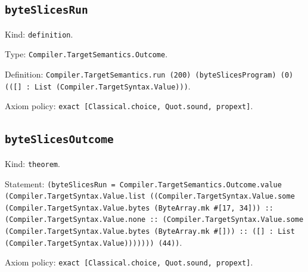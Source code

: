 \documentclass[11pt]{article}
\begin{document}
\subsection*{\texttt{byteSlicesRun}}
\noindent Kind: \texttt{definition}.\par
\noindent Type: \texttt{Compiler.TargetSemantics.Outcome}.\par
\noindent Definition: \texttt{Compiler.TargetSemantics.run (200) (byteSlicesProgram) (0) (([] : List (Compiler.TargetSyntax.Value)))}.\par
\noindent Axiom policy: \texttt{exact [Classical.choice, Quot.sound, propext]}.\par
\subsection*{\texttt{byteSlicesOutcome}}
\noindent Kind: \texttt{theorem}.\par
\noindent Statement: \texttt{(byteSlicesRun = Compiler.TargetSemantics.Outcome.value (Compiler.TargetSyntax.Value.list ((Compiler.TargetSyntax.Value.some (Compiler.TargetSyntax.Value.bytes (ByteArray.mk \#[17, 34])) :: (Compiler.TargetSyntax.Value.none :: (Compiler.TargetSyntax.Value.some (Compiler.TargetSyntax.Value.bytes (ByteArray.mk \#[])) :: ([] : List (Compiler.TargetSyntax.Value))))))) (44))}.\par
\noindent Axiom policy: \texttt{exact [Classical.choice, Quot.sound, propext]}.\par
\end{document}
